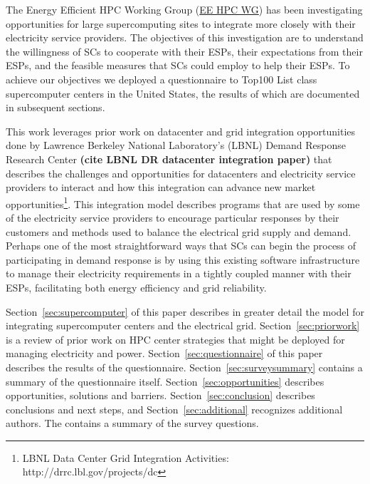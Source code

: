 The Energy Efficient HPC Working Group (\href {http://eehpcwg.lbl.gov/}{EE HPC WG})  
has been investigating opportunities for large supercomputing sites to  
integrate more closely with their electricity service providers.
The objectives of this investigation are to understand the willingness of SCs to
cooperate with their ESPs, their expectations from their ESPs, and the feasible measures
that SCs could employ to help their ESPs.
To achieve our objectives we deployed a questionnaire to
Top100 List class supercomputer centers in the United States, the results of
which are documented in subsequent sections.

This work leverages prior work on datacenter and grid integration opportunities
done by Lawrence Berkeley National Laboratory's (LBNL) Demand Response 
Research Center \textbf{(cite LBNL DR datacenter integration paper)}
that describes the challenges and opportunities for datacenters and electricity
service providers to interact and how this integration can advance 
new market 
opportunities\footnote{LBNL Data Center Grid Integration Activities: http://drrc.lbl.gov/projects/dc}.
This integration model describes programs that are used by some of the electricity 
service providers to encourage particular responses by their customers and methods 
used to balance the electrical grid supply and demand.
Perhaps one of the most straightforward ways that SCs can begin
the process of participating in demand response is by using this existing software 
infrastructure to manage their electricity requirements in a tightly coupled manner 
with their ESPs, facilitating both energy efficiency and grid reliability.

Section~\ref{sec:supercomputer}  of this paper describes in greater detail the model for
integrating supercomputer centers and the electrical grid. Section~\ref{sec:priorwork}
is a review of prior work on HPC center strategies that might be
deployed for managing electricity and power. Section~\ref{sec:questionnaire} of this paper
describes the results of the questionnaire. Section~\ref{sec:surveysummary}
contains a summary of the questionnaire itself. Section~\ref{sec:opportunities} 
describes opportunities, solutions and barriers. Section~\ref{sec:conclusion} describes
conclusions and next steps, and Section~\ref{sec:additional} recognizes additional
authors. The  contains a summary of the survey questions.

